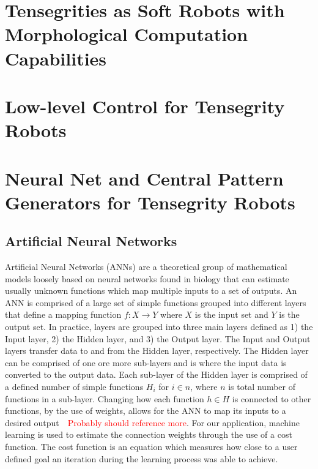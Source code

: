 \section{Tensegrities as Soft Robots with Morphological Computation Capabilities}
\label{sec:robots}


\section{Low-level Control for Tensegrity Robots}
\label{sec:control}


\section{Neural Net and Central Pattern Generators for Tensegrity Robots}
\label{sec:NN_and_CPG_overview}

\subsection{Artificial Neural Networks}
Artificial Neural Networks (ANNs) are a theoretical group of mathematical models loosely based on neural networks found in biology that can estimate usually unknown functions which map multiple inputs to a set of outputs.
An ANN is comprised of a large set of simple functions grouped into different layers that define a mapping function \(f:X \to Y\) where \(X\) is the input set and \(Y\) is the output set.
In practice, layers are grouped into three main layers defined as 1) the Input layer, 2) the Hidden layer, and 3) the Output layer.
The Input and Output layers transfer data to and from the Hidden layer, respectively.
The Hidden layer can be comprised of one ore more sub-layers and is where the input data is converted to the output data.
Each sub-layer of the Hidden layer is comprised of a defined number of simple functions \(H_{i}\) for \(i \in n\), where \(n\) is total number of functions in a sub-layer.
Changing how each function \(h \in H\) is connected to other functions, by the use of weights, allows for the ANN to map its inputs to a desired output~\cite{lippmann1987introduction}~\textcolor{red}{Probably should reference more}. For our application, machine learning is used to estimate the connection weights through the use of a cost function.
The cost function is an equation which measures how close to a user defined goal an iteration during the learning process was able to achieve.


